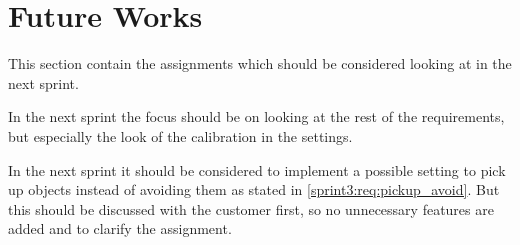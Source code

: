\section{Future Works}
This section contain the assignments which should be considered looking at in the next sprint.

In the next sprint the focus should be on looking at the rest of the requirements, but especially the look of the calibration in the settings.

In the next sprint it should be considered to implement a possible setting to pick up objects instead of avoiding them as stated in \cref{sprint3:req:pickup_avoid}.
But this should be discussed with the customer first, so no unnecessary features are added and to clarify the assignment.